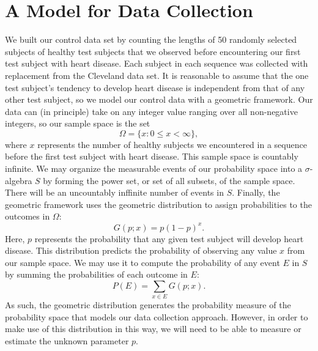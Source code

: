\documentclass{amsart}
\begin{document}
\section{A Model for Data Collection}
We built our control data set by counting the lengths of 50 randomly selected subjects of healthy test subjects that we observed before encountering our first test subject with heart disease. Each subject in each sequence was collected with replacement from the Cleveland data set. It is reasonable to assume that the one test subject's tendency to develop heart disease is independent from that of any other test subject, so we model our control data with a geometric framework. Our data can (in principle) take on any integer value ranging over all non-negative integers, so our sample space is the set $$\Omega=\{x: 0\le x< \infty\},$$  where $x$ represents the number of healthy subjects we encountered in a sequence before the first test subject with heart disease. This sample space is countably infinite. We may organize the measurable events of our probability space into a $\sigma$-algebra $S$ by forming the power set, or set of all subsets, of the sample space.  There will be an uncountably inffinite number of events in $S$. Finally, the geometric framework uses the geometric distribution to assign probabilities to the outcomes in $\Omega$:
\[
G(p;x)=p(1-p)^x.
\]
Here, $p$ represents the probability that any given test subject will develop heart disease. This distribution predicts the probability of observing any value $x$ from our sample space. We may use it to compute the probability of any event $E$ in $S$ by summing the probabilities of each outcome in $E$:
\[
P(E)=\sum_{x\in E} G(p;x).
\]
As such, the geometric distribution generates the probability measure of the probability space that models our data collection approach. However, in order to make use of this distribution in this way, we will need to be able to measure or estimate the unknown parameter $p$.
\end{document}
